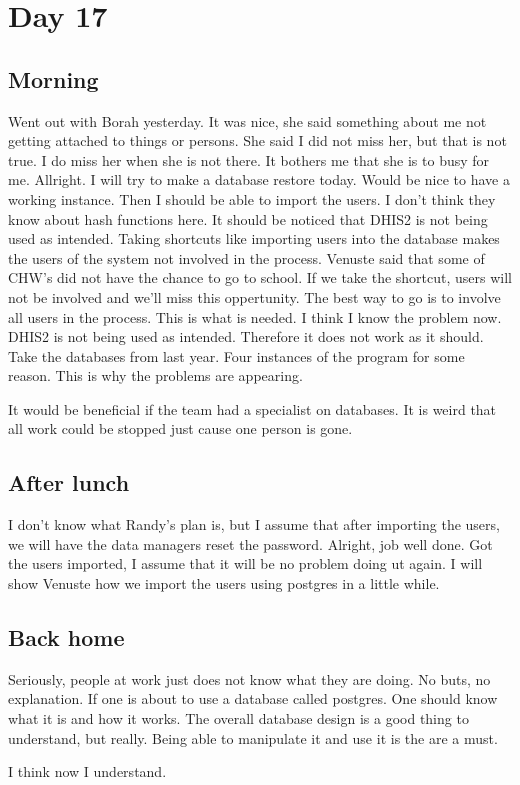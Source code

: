 \section{Day 17}
\subsection{Morning}
Went out with Borah yesterday.
It was nice, she said something about me not getting attached to things or persons.
She said I did not miss her, but that is not true.
I do miss her when she is not there. It bothers me that she is to busy for me.
Allright. I will try to make a database restore today.
Would be nice to have a working instance.
Then I should be able to import the users.
I don't think they know about hash functions here.
It should be noticed that DHIS2 is not being used as intended.
Taking shortcuts like importing users into the database makes the users of the system not involved in the process. Venuste said that some of CHW's did not have the chance to go to school. 
If we take the shortcut, users will not be involved and we'll miss this oppertunity.
The best way to go is to involve all users in the process. This is what is needed.
I think I know the problem now. DHIS2 is not being used as intended.
Therefore it does not work as it should.
Take the databases from last year. Four instances of the program for some reason.
This is why the problems are appearing.

It would be beneficial if the team had a specialist on databases. 
It is weird that all work could be stopped just cause one person is gone.

\subsection{After lunch}
I don't know what Randy's plan is, but I assume that after importing the users, we will have the data managers reset the password.
Alright, job well done. Got the users imported, I assume that it will be no problem doing ut again.
I will show Venuste how we import the users using postgres in a little while. 

\subsection{Back home}
Seriously, people at work just does not know what they are doing.
No buts, no explanation. If one is about to use a database called postgres.
One should know what it is and how it works. 
The overall database design is a good thing to understand, but really.
Being able to manipulate it and use it is the are a must.

I think now I understand. 